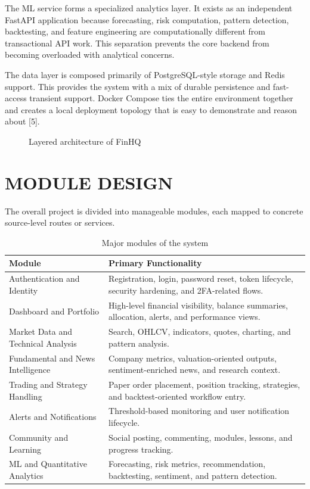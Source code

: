 \documentclass[12pt,a4paper]{report}
\newcommand{\projectshort}{FinHQ}
\begin{document}
The ML service forms a specialized analytics layer. It exists as an independent FastAPI application because forecasting, risk computation, pattern detection, backtesting, and feature engineering are computationally different from transactional API work. This separation prevents the core backend from becoming overloaded with analytical concerns.

The data layer is composed primarily of PostgreSQL-style storage and Redis support. This provides the system with a mix of durable persistence and fast-access transient support. Docker Compose ties the entire environment together and creates a local deployment topology that is easy to demonstrate and reason about [5].

\begin{figure}[H]
\centering
{}
\caption{Layered architecture of \projectshort{}}
\end{figure}

\section{MODULE DESIGN}
The overall project is divided into manageable modules, each mapped to concrete source-level routes or services.

\begin{table}[H]
\centering
\caption{Major modules of the system}
\begin{tabularx}{\textwidth}{>{\raggedright\arraybackslash}p{2in} X}
\toprule
\textbf{Module} & \textbf{Primary Functionality} \\
\midrule
Authentication and Identity & Registration, login, password reset, token lifecycle, security hardening, and 2FA-related flows. \\
Dashboard and Portfolio & High-level financial visibility, balance summaries, allocation, alerts, and performance views. \\
Market Data and Technical Analysis & Search, OHLCV, indicators, quotes, charting, and pattern analysis. \\
Fundamental and News Intelligence & Company metrics, valuation-oriented outputs, sentiment-enriched news, and research context. \\
Trading and Strategy Handling & Paper order placement, position tracking, strategies, and backtest-oriented workflow entry. \\
Alerts and Notifications & Threshold-based monitoring and user notification lifecycle. \\
Community and Learning & Social posting, commenting, modules, lessons, and progress tracking. \\
ML and Quantitative Analytics & Forecasting, risk metrics, recommendation, backtesting, sentiment, and pattern detection. \\
\bottomrule
\end{tabularx}
\end{table}
\end{document}
